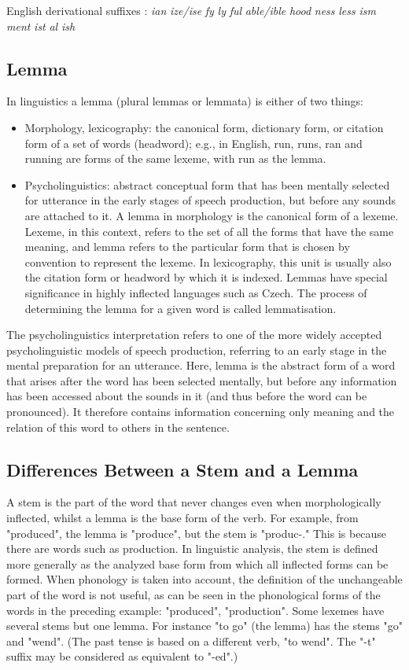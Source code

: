 English derivational suffixes :
\emph{ian}
\emph{ize/ise}
\emph{fy}
\emph{ly}
\emph{ful}
\emph{able/ible}
\emph{hood}
\emph{ness}
\emph{less}
\emph{ism}
\emph{ment}
\emph{ist}
\emph{al}
\emph{ish}

\subsection{Lemma}
In linguistics a lemma (plural lemmas or lemmata) is either of two things:
\begin{itemize}
  \item Morphology, lexicography: the canonical form, dictionary form, or citation form of a set of words (headword); e.g., in English, run, runs, ran and running are forms of the same lexeme, with run as the lemma.
  \item Psycholinguistics: abstract conceptual form that has been mentally selected for utterance in the early stages of speech production, but before any sounds are attached to it.
A lemma in morphology is the canonical form of a lexeme. Lexeme, in this context, refers to the set of all the forms that have the same meaning, and lemma refers to the particular form that is chosen by convention to represent the lexeme. In lexicography, this unit is usually also the citation form or headword by which it is indexed. Lemmas have special significance in highly inflected languages such as Czech. The process of determining the lemma for a given word is called lemmatisation.
\end{itemize}
The psycholinguistics interpretation refers to one of the more widely accepted psycholinguistic models of speech production, referring to an early stage in the mental preparation for an utterance. Here, lemma is the abstract form of a word that arises after the word has been selected mentally, but before any information has been accessed about the sounds in it (and thus before the word can be pronounced). It therefore contains information concerning only meaning and the relation of this word to others in the sentence.

\subsection{Differences Between a Stem and a Lemma}
A stem is the part of the word that never changes even when morphologically inflected, whilst a lemma is the base form of the verb. For example, from "produced", the lemma is "produce", but the stem is "produc-." This is because there are words such as production. In linguistic analysis, the stem is defined more generally as the analyzed base form from which all inflected forms can be formed. When phonology is taken into account, the definition of the unchangeable part of the word is not useful, as can be seen in the phonological forms of the words in the preceding example: "produced", "production".  Some lexemes have several stems but one lemma. For instance "to go" (the lemma) has the stems "go" and "wend". (The past tense is based on a different verb, "to wend". The "-t" suffix may be considered as equivalent to "-ed".)

